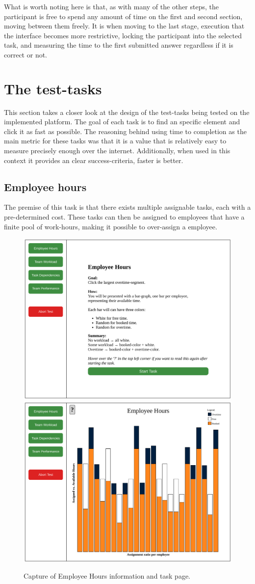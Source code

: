 {  What is worth noting here is that, as with many of the other steps, the
  participant is free to spend any amount of time on the first and second
  section, moving between them freely. It is when moving to the last stage,
  execution that the interface becomes more restrictive, locking the
  participant into the selected task, and measuring the time to the first
  submitted answer regardless if it is correct or not.

\section{The test-tasks}

	This section takes a closer look at the design of the test-tasks being tested
	on the implemented platform. The goal of each task is to find an specific
	element and click it as fast as possible. The reasoning behind using time to
	completion as the main metric for these tasks was that it is a value that is
	relatively easy to measure precisely enough over the internet. Additionally,
	when used in this context it provides an clear success-criteria, faster is
	better.

  \subsection{Employee hours}

		The premise of this task is that there exists multiple assignable tasks, each
		with a pre-determined cost. These tasks can then be assigned to employees
		that have a finite pool of work-hours, making it possible to over-assign a
		employee.

    \begin{figure}[h!]
      \centering
      \includegraphics[width=.49\textwidth]{figures/captures/webapp_employee_hours_info.pdf}
      \includegraphics[width=.49\textwidth]{figures/captures/webapp_employee_hours_task.pdf}
      \caption{Capture of Employee Hours information and task page.}
    \end{figure}

}

